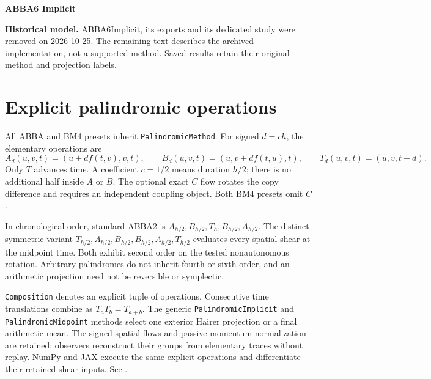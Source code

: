 \documentclass[11pt,a4paper]{article}
\begin{document}
\begin{center}
 {\LARGE\bfseries\color{gcblue}ABBA6 Implicit}\par
 \vspace{0.35em}{\large One symmetric projection around a Yoshida composition}
\end{center}

\textbf{Historical model.} ABBA6Implicit, its exports and its dedicated study
were removed on 2026-10-25. The remaining text describes the archived
implementation, not a supported method. Saved results retain their original
method and projection labels.

\section*{Explicit palindromic operations}
All ABBA and BM4 presets inherit \texttt{PalindromicMethod}. For signed
$d=c h$, the elementary operations are
\[
 A_d(u,v,t)=(u+d f(t,v),v,t),\qquad
 B_d(u,v,t)=(u,v+d f(t,u),t),\qquad
 T_d(u,v,t)=(u,v,t+d).
\]
Only $T$ advances time. A coefficient $c=1/2$ means duration $h/2$;
there is no additional half inside $A$ or $B$. The optional exact $C$ flow
rotates the copy difference and requires an independent coupling object.
Both BM4 presets omit $C$.

In chronological order, standard ABBA2 is
$A_{h/2},B_{h/2},T_h,B_{h/2},A_{h/2}$.
The distinct symmetric variant
$T_{h/2},A_{h/2},B_{h/2},B_{h/2},A_{h/2},T_{h/2}$
evaluates every spatial shear at the midpoint time. Both exhibit second
order on the tested nonautonomous rotation. Arbitrary palindromes do not
inherit fourth or sixth order, and an arithmetic projection need not be
reversible or symplectic.

\texttt{Composition} denotes an explicit tuple of operations.
Consecutive time translations combine as $T_a T_b=T_{a+b}$.
The generic \texttt{PalindromicImplicit} and \texttt{PalindromicMidpoint}
methods select one exterior Hairer projection or a final arithmetic mean.
The signed spatial flows and passive momentum normalization are retained;
observers reconstruct their groups from elementary traces without replay. NumPy and JAX execute the same
explicit operations and differentiate their retained shear inputs.
See .
\end{document}
